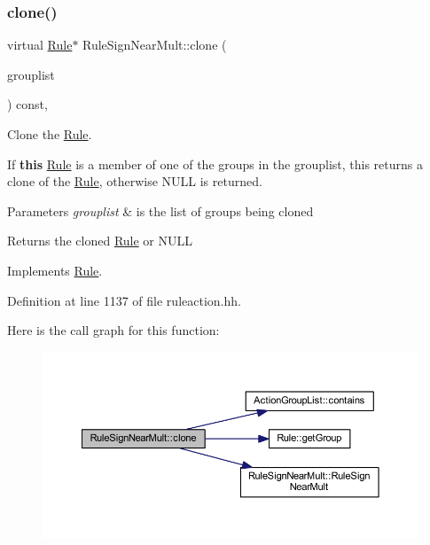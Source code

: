 \subsubsection{\texorpdfstring{clone()}{clone()}}
{\footnotesize\ttfamily virtual \mbox{\hyperlink{class_rule}{Rule}}$\ast$ Rule\+Sign\+Near\+Mult\+::clone (\begin{DoxyParamCaption}\item[{const \mbox{\hyperlink{class_action_group_list}{Action\+Group\+List}} \&}]{grouplist }\end{DoxyParamCaption}) const\hspace{0.3cm}{\ttfamily [inline]}, {\ttfamily [virtual]}}



Clone the \mbox{\hyperlink{class_rule}{Rule}}. 

If {\bfseries{this}} \mbox{\hyperlink{class_rule}{Rule}} is a member of one of the groups in the grouplist, this returns a clone of the \mbox{\hyperlink{class_rule}{Rule}}, otherwise N\+U\+LL is returned. 
\begin{DoxyParams}{Parameters}
{\em grouplist} & is the list of groups being cloned \\
\hline
\end{DoxyParams}
\begin{DoxyReturn}{Returns}
the cloned \mbox{\hyperlink{class_rule}{Rule}} or N\+U\+LL 
\end{DoxyReturn}


Implements \mbox{\hyperlink{class_rule_a70de90a76461bfa7ea0b575ce3c11e4d}{Rule}}.



Definition at line 1137 of file ruleaction.\+hh.

Here is the call graph for this function\+:
\nopagebreak
\begin{figure}[H]
\begin{center}
\leavevmode
\includegraphics[width=350pt]{class_rule_sign_near_mult_a53b45d474b33bcf2fd77a382717d0365_cgraph}
\end{center}
\end{figure}
\mbox{\label{class_rule_sign_near_mult_a4c1e22ea265dc4da51b6a05e1089b3fe}} 
